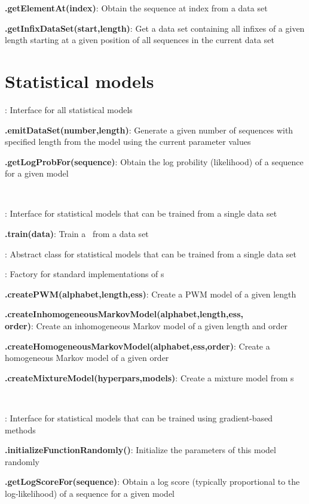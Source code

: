 \documentclass[10pt]{scrartcl}
\newcommand{\entry}[3]{{\bfseries #1#2}: #3}
\begin{document}
\begin{flushleft}
\entry{\DataSet}{.getElementAt(index)}{Obtain the sequence at index from a data set}

\entry{\DataSet}{.getInfixDataSet(start,length)}{Get a data set containing all infixes of a given length starting at a given position of all sequences in the current data set}


\section{Statistical models}

\entry{\StatMod}{}{Interface for all statistical models}

\entry{\StatMod}{.emitDataSet(number,length)}{Generate a given number of sequences with specified length from the model using the current parameter values}

\entry{\StatMod}{.getLogProbFor(sequence)}{Obtain the log probility (likelihood) of a sequence for a given model}

~

\entry{\TrainSM}{}{Interface for statistical models that can be trained from a single data set}

\entry{\TrainSM}{.train(data)}{Train a \TrainSM~from a data set}

\entry{\AbstractTrainSM}{}{Abstract class for statistical models that can be trained from a single data set}

\entry{\TrainSMFactory}{}{Factory for standard implementations of \TrainSM s}

\entry{\TrainSMFactory}{.createPWM(alphabet,length,ess)}{Create a PWM model of a given length}

\entry{\TrainSMFactory}{.createInhomogeneousMarkovModel(alphabet,length,ess,\\order)}{Create an inhomogeneous Markov model of a given length and order}

\entry{\TrainSMFactory}{.createHomogeneousMarkovModel(alphabet,ess,order)}{Create a homogeneous Markov model of a given order}

\entry{\TrainSMFactory}{.createMixtureModel(hyperpars,models)}{Create a mixture model from \TrainSM s}

~

\entry{\DiffSM}{}{Interface for statistical models that can be trained using gradient-based methods}

\entry{\DiffSM}{.initializeFunctionRandomly()}{Initialize the parameters of this model randomly}

\entry{\DiffSM}{.getLogScoreFor(sequence)}{Obtain a log score (typically proportional to the log-likelihood) of a sequence for a given model}


\end{flushleft}
\end{document}
